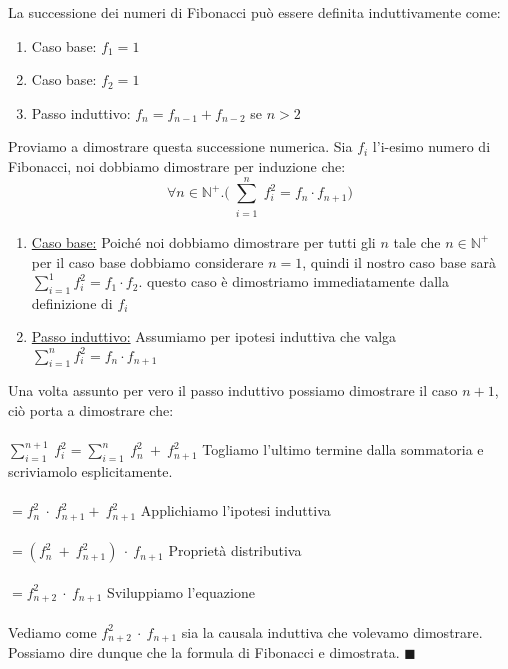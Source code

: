 \begin{example}
    La successione dei numeri di Fibonacci può essere definita induttivamente come:
    \begin{enumerate}
        \item Caso base: $f_1 = 1$
        \item Caso base: $f_2 = 1$
        \item Passo induttivo: $f_n = f_{n-1} + f_{n-2}$ \hspace{.5cm} se $n > 2$
    \end{enumerate}
    \begin{demostration}
        Proviamo a dimostrare questa successione numerica. Sia $f_i$ l'i-esimo numero di Fibonacci, noi dobbiamo dimostrare per induzione che:
        \begin{equation}
            \forall n \in \mathbb{N}^{+}.\bigg(\sum_{\substack{i=1}}^n f_i^2 = f_n \cdot f_{n+1} \bigg)
        \end{equation}
        \begin{enumerate}
            \item \underline{Caso base:} Poiché noi dobbiamo dimostrare per tutti gli $n$ tale che $n \in \mathbb{N}^{+}$ per il caso base dobbiamo considerare $n = 1$, quindi il nostro caso base sarà $\sum_{i=1}^1 f_i^{2} = f_1 \cdot f_{2}$. questo caso è dimostriamo immediatamente dalla definizione di $f_i$
            \item \underline{Passo induttivo:} Assumiamo per ipotesi induttiva che valga $\sum_{i=1}^n f_i^{2} = f_n \cdot f_{n+1}$
        \end{enumerate}
        Una volta assunto per vero il passo induttivo possiamo dimostrare il caso $n+1$, ciò porta a dimostrare che:\\ \\
        $\sum_{i=1}^{n+1}\:f_i^{2} = \sum_{i=1}^{n}\:f_n^2 \: + \: f_{n+1}^2$ \hspace{.3cm} Togliamo l'ultimo termine dalla sommatoria e scriviamolo esplicitamente. \\ \\
        $= f_n^2 \: \cdot \: f_{n+1}^2 + \: f_{n+1}^2$ \hspace{.3cm} Applichiamo l'ipotesi induttiva \\ \\
        $= (f_n^2 \: + \: f_{n+1}^2) \: \cdot \: f_{n+1}$  \hspace{.3cm} Proprietà distributiva\\ \\
        $= f_{n+2}^2 \: \cdot \: f_{n+1}$  \hspace{.3cm} Sviluppiamo l'equazione \\\\
        Vediamo come $f_{n+2}^2 \: \cdot \: f_{n+1}$ sia la causala induttiva che volevamo dimostrare. Possiamo dire dunque che la formula di Fibonacci e dimostrata. $\blacksquare$
    \end{demostration}
\end{example}

